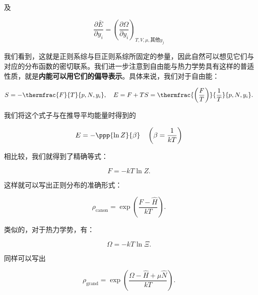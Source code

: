 及
\begin{linenomath}\begin{equation}
\frac{\partial \bar E}{\partial y_i} = \left( \frac{\partial  \Omega}{\partial y_i} \right)_{T,V,\mu,\text{其他}y_j}\label{macro_micro3}
\end{equation}\end{linenomath}
我们看到，这就是正则系综与巨正则系综所固定的参量，因此自然可以想见它们与对应的分布函数的密切联系。我们进一步注意到自由能与热力学势具有这样的普适性质，就是\textbf{内能可以用它们的偏导表示}。具体来说，我们对于自由能：
\begin{linenomath}\begin{equation}
S = -\thermfrac{F}{T}{p,N,y_i},\quad E = F + TS = \thermfrac{\left(\frac FT  \right)}{\frac{1}{T}}{p,N,y_i}.
\end{equation}\end{linenomath}
我们将这个式子与在推导平均能量时得到的 \begin{linenomath}\begin{equation}E = -\ppp{\ln Z}{\beta}\quad \left( \beta = \frac{1}{kT} \right)\end{equation}\end{linenomath} 相比较，我们就得到了精确等式：
\begin{linenomath}\begin{equation}
F = -kT\ln Z.
\end{equation}\end{linenomath}
这样就可以写出正则分布的准确形式：\begin{linenomath}\begin{equation}
\rho_{\text{canon}} = \exp\left( \frac{F-\hat{H}}{kT} \right).
\end{equation}\end{linenomath}
 类似的，对于热力学势，有：
\begin{linenomath}\begin{equation}
\Omega = -kT\ln \Xi.
\end{equation}\end{linenomath}
同样可以写出
\begin{linenomath}\begin{equation}
\rho_{\text{grand}} = \exp\left( \frac{\Omega - \hat{H} + \mu \hat{N}}{kT} \right).
\end{equation}\end{linenomath}


